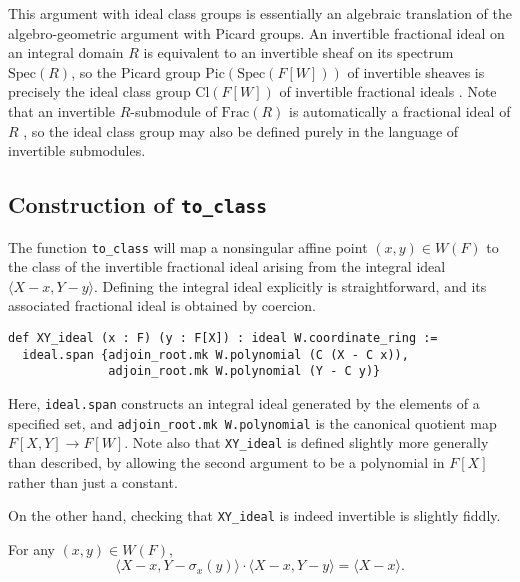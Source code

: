 \documentclass[a4paper,UKenglish,cleveref,autoref,thm-restate]{lipics-v2021}
\begin{document}
\begin{remark}
This argument with ideal class groups is essentially an algebraic translation of the algebro-geometric argument with Picard groups. An invertible fractional ideal on an integral domain $ R $ is equivalent to an invertible sheaf on its spectrum $ \mathrm{Spec}(R) $, so the Picard group $ \mathrm{Pic}(\mathrm{Spec}(F[W])) $ of invertible sheaves is precisely the ideal class group $ \mathrm{Cl}(F[W]) $ of invertible fractional ideals \cite[Example II.6.3.2]{hartshorne}. Note that an invertible $ R $-submodule of $ \mathrm{Frac}(R) $ is automatically a fractional ideal of $ R $ \cite[Theorem 11.6]{eisenbud}, so the ideal class group may also be defined purely in the language of invertible submodules.
\end{remark}

\pagebreak

\subsection{Construction of \texttt{to\_class}}

The function \texttt{to\_class} will map a nonsingular affine point $ (x, y) \in W(F) $ to the class of the invertible fractional ideal arising from the integral ideal $ \langle X - x, Y - y \rangle $. Defining the integral ideal explicitly is straightforward, and its associated fractional ideal is obtained by coercion.
\begin{lstlisting}
def XY_ideal (x : F) (y : F[X]) : ideal W.coordinate_ring :=
  ideal.span {adjoin_root.mk W.polynomial (C (X - C x)),
              adjoin_root.mk W.polynomial (Y - C y)}
\end{lstlisting}
Here, \texttt{ideal.span} constructs an integral ideal generated by the elements of a specified set, and \texttt{adjoin\_root.mk W.polynomial} is the canonical quotient map $ F[X, Y] \to F[W] $. Note also that \texttt{XY\_ideal} is defined slightly more generally than described, by allowing the second argument to be a polynomial in $ F[X] $ rather than just a constant.

On the other hand, checking that \texttt{XY\_ideal} is indeed invertible is slightly fiddly.

\begin{lemma}
\label{lem:XY_ideal_neg_mul}
For any $ (x, y) \in W(F) $,
\[ \langle X - x, Y - \sigma_x(y) \rangle \cdot \langle X - x, Y - y \rangle = \langle X - x \rangle. \]
\end{lemma}
\end{document}
